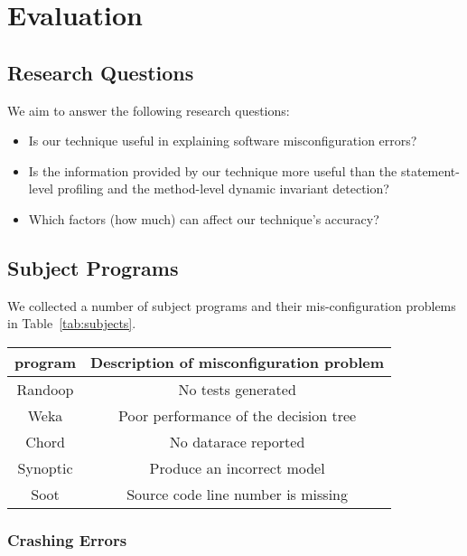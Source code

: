 \section{Evaluation}

\subsection{Research Questions}

We aim to answer the following research questions:

\begin{itemize}
\item Is our technique useful in explaining software misconfiguration errors?
\item Is the information provided by our technique more useful than the statement-level
profiling and the method-level dynamic invariant detection?
\item Which factors (how much) can affect our technique's accuracy?
\end{itemize}

\subsection{Subject Programs}

We collected a number of subject programs and their mis-configuration problems in
Table~\ref{tab:subjects}.

\begin{table}[t]
\setlength{\tabcolsep}{.94\tabcolsep}
\begin{tabular}{|c|c|}
\hline
 program & Description of misconfiguration problem \\
 \hline
 \hline
 Randoop &  No tests generated \\
\hline
 Weka &  Poor performance of the decision tree \\
\hline
 Chord &  No datarace reported \\
\hline
 Synoptic &  Produce an incorrect model \\
\hline
 Soot &  Source code line number is missing \\
\hline
\end{tabular}

\end{table}

\subsubsection{Crashing Errors}

